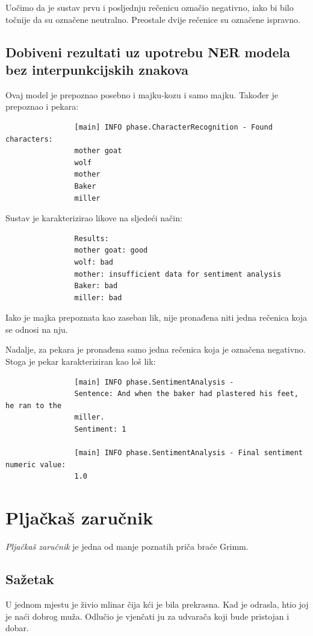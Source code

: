 \documentclass[a4paper,twoside,12pt]{memoir} %
\newcommand{\ti}[1]{\textit{#1\/}}
\begin{document}
		Uočimo da je sustav prvu i posljednju rečenicu označio negativno, iako bi bilo točnije da su označene neutralno. Preostale dvije rečenice su označene ispravno.


		\subsection{Dobiveni rezultati uz upotrebu NER modela bez interpunkcijskih znakova}

			Ovaj model je prepoznao posebno i majku-kozu i samo majku. Također je prepoznao i pekara:

			\begin{verbatim}
				[main] INFO phase.CharacterRecognition - Found characters:
				mother goat
				wolf
				mother
				Baker
				miller
			\end{verbatim}

			Sustav je karakterizirao likove na sljedeći način:

			\begin{verbatim}
				Results:
				mother goat: good
				wolf: bad
				mother: insufficient data for sentiment analysis
				Baker: bad
				miller: bad
			\end{verbatim}

			Iako je majka prepoznata kao zaseban lik, nije pronađena niti jedna rečenica koja se odnosi na nju.

			Nadalje, za pekara je pronađena samo jedna rečenica koja je označena negativno. Stoga je pekar karakteriziran kao loš lik:

			\begin{verbatim}
				[main] INFO phase.SentimentAnalysis -
				Sentence: And when the baker had plastered his feet, he ran to the
				miller.
				Sentiment: 1

				[main] INFO phase.SentimentAnalysis - Final sentiment numeric value:
				1.0
			\end{verbatim}

	\section{Pljačkaš zaručnik}

		\ti{Pljačkaš zaručnik} je jedna od manje poznatih priča braće Grimm.

		\subsection{Sažetak}

		U jednom mjestu je živio mlinar čija kći je bila prekrasna. Kad je odrasla, htio joj je naći dobrog muža. Odlučio je vjenčati ju za udvarača koji bude pristojan i dobar.
\end{document}

